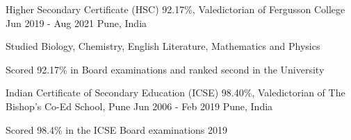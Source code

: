 \resumeExp
{Higher Secondary Certificate (HSC)}
{92.17\%, Valedictorian of Fergusson College}
{Jun 2019 - Aug 2021}
{Pune, India}

\resumeItemListStart
        \item[$\bullet$] {Studied Biology, Chemistry, English Literature, Mathematics and Physics}
	    \item[$\bullet$] {Scored 92.17\% in Board examinations and ranked second in the University}
\resumeItemListEnd

\resumeExp
{Indian Certificate of Secondary Education (ICSE)}
{98.40\%, Valedictorian of The Bishop's Co-Ed School, Pune}
{Jun 2006 - Feb 2019}
{Pune, India}

\resumeItemListStart
        \item[$\bullet$] {Scored 98.4\% in the ICSE Board examinations 2019}
\resumeItemListEnd


\resumeSubHeadingListEnd
\vspace{-5.5mm}